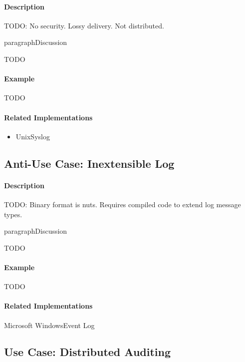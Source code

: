\paragraph{Description}

{\Large TODO:} No security.  Lossy delivery.  Not distributed.

paragraph{Discussion}

{\Large TODO}

\paragraph{Example}

{\Large TODO}

\paragraph{Related Implementations}

\begin{itemize}
	\item Unix\texttrademark Syslog
\end{itemize}

\subsection{Anti-Use Case: Inextensible Log}

\paragraph{Description}

{\Large TODO:} Binary format is nuts. Requires compiled code to extend log message types.

paragraph{Discussion}

{\Large TODO}

\paragraph{Example}

{\Large TODO}

\paragraph{Related Implementations}

Microsoft Windows\texttrademark Event Log

\subsection{Use Case: Distributed Auditing}

